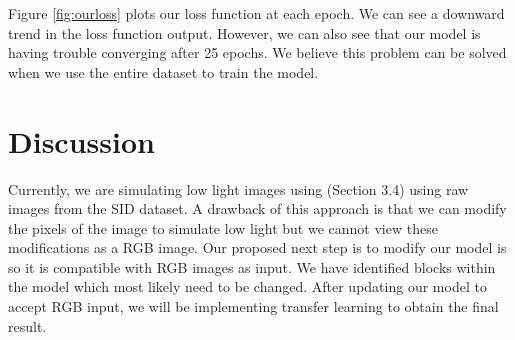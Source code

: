 \documentclass{article}
\begin{document}
Figure \ref{fig:ourloss} plots our loss function at each epoch. We can
see a downward trend in the loss function output. However, we can also
see that our model is having trouble converging after 25 epochs. We believe
this problem can be solved when we use the entire dataset to train the model.

\section{Discussion}

Currently, we are simulating low light images using (Section 3.4) using
raw images from the SID dataset. A drawback of this approach is that we
can modify the pixels of the image to simulate low light but we cannot
view these modifications as a RGB image. Our proposed next step is to modify
our model is so it is compatible with RGB images as input. We have identified
blocks within the model which most likely need to be changed. After
updating our model to accept RGB input, we will be implementing transfer
learning to obtain the final result. 




\end{document}
